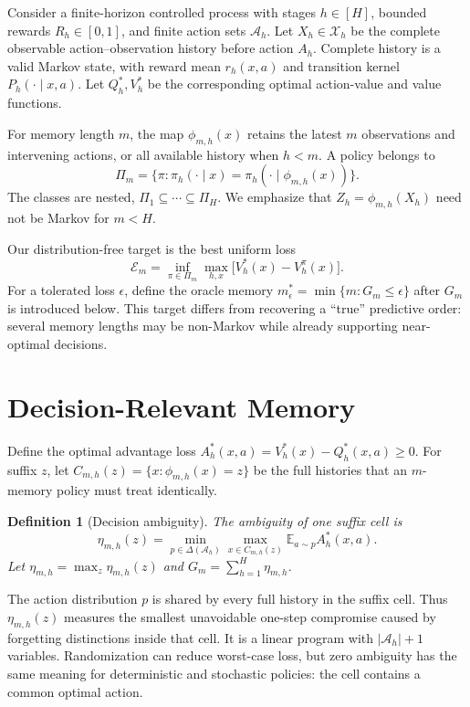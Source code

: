 \documentclass[letterpaper]{article} %
\newtheorem{definition}{Definition}
\theoremstyle{remark}
\newcommand{\cX}{\mathcal X}
\newcommand{\cA}{\mathcal A}
\newcommand{\E}{\mathbb E}
\begin{document}
Consider a finite-horizon controlled process with stages $h\in[H]$, bounded
rewards $R_h\in[0,1]$, and finite action sets $\cA_h$. Let
$X_h\in\cX_h$ be the complete observable action--observation history before
action $A_h$. Complete history is a valid Markov state, with reward mean
$r_h(x,a)$ and transition kernel $P_h(\cdot\mid x,a)$. Let $Q_h^*,V_h^*$
be the corresponding optimal action-value and value functions.

For memory length $m$, the map $\phi_{m,h}(x)$ retains the latest $m$
observations and intervening actions, or all available history when $h<m$. A
policy belongs to
\[
\Pi_m=\{\pi:\pi_h(\cdot\mid x)
=\pi_h(\cdot\mid\phi_{m,h}(x))\}.
\]
The classes are nested, $\Pi_1\subseteq\cdots\subseteq\Pi_H$. We emphasize
that $Z_h=\phi_{m,h}(X_h)$ need not be Markov for $m<H$.

Our distribution-free target is the best uniform loss
\[
\mathcal E_m
=\inf_{\pi\in\Pi_m}\max_{h,x}
\bigl[V_h^*(x)-V_h^\pi(x)\bigr].
\tag{1}\label{eq:uniformloss}
\]
For a tolerated loss $\epsilon$, define the oracle memory
$m_\epsilon^*=\min\{m:G_m\leq\epsilon\}$ after $G_m$ is introduced below.
This target differs from recovering a ``true'' predictive order: several
memory lengths may be non-Markov while already supporting near-optimal
decisions.

\section{Decision-Relevant Memory}

Define the optimal advantage loss
$A_h^*(x,a)=V_h^*(x)-Q_h^*(x,a)\geq0$. For suffix $z$, let
$C_{m,h}(z)=\{x:\phi_{m,h}(x)=z\}$ be the full histories that an
$m$-memory policy must treat identically.

\begin{definition}[Decision ambiguity]
The ambiguity of one suffix cell is
\[
\eta_{m,h}(z)=
\min_{p\in\Delta(\cA_h)}
\max_{x\in C_{m,h}(z)}
\E_{a\sim p}A_h^*(x,a).
\tag{2}\label{eq:eta}
\]
Let $\eta_{m,h}=\max_z\eta_{m,h}(z)$ and
$G_m=\sum_{h=1}^H\eta_{m,h}$.
\end{definition}

The action distribution $p$ is shared by every full history in the suffix
cell. Thus $\eta_{m,h}(z)$ measures the smallest unavoidable one-step
compromise caused by forgetting distinctions inside that cell. It is a linear
program with $|\cA_h|+1$ variables. Randomization can reduce worst-case loss,
but zero ambiguity has the same meaning for deterministic and stochastic
policies: the cell contains a common optimal action.
\end{document}
